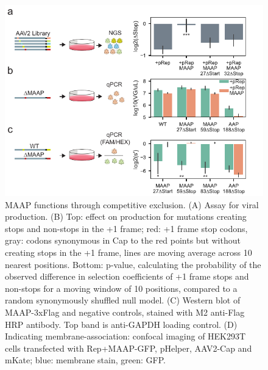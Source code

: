 \begin{figure}
\includegraphics[width=1\linewidth]{figures/20190604_fig7_library_complement.pdf}
\caption[MAAP functions through competitive exclusion]{MAAP functions through competitive exclusion. (A) Assay for viral production. (B) Top: effect on production for mutations creating stops and non-stops in the +1 frame; red: +1 frame stop codons, gray: codons synonymous in Cap to the red points but without creating stops in the +1 frame, lines are moving average across 10 nearest positions. Bottom: p-value, calculating the probability of the observed difference in selection coefficients of +1 frame stops and non-stops for a moving window of 10 positions, compared to a random synonymously shuffled null model. (C) Western blot of MAAP-3xFlag and negative controls, stained with M2 anti-Flag HRP antibody. Top band is anti-GAPDH loading control. (D) Indicating membrane-association: confocal imaging of HEK293T cells transfected with Rep+MAAP-GFP, pHelper, AAV2-Cap and mKate; blue: membrane stain, green: GFP. 
\label{fig:Figure 4}}
\end{figure}

